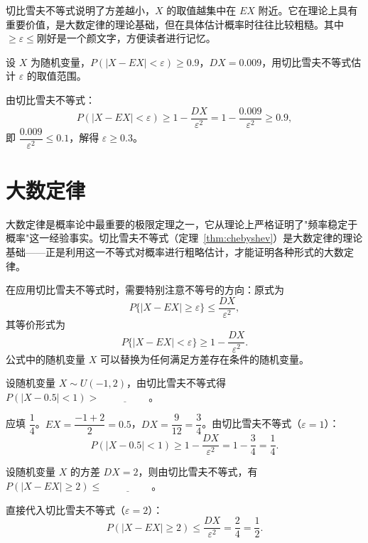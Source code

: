 \documentclass[lang=cn,11pt]{elegantbook}
\begin{document}
\begin{note}
切比雪夫不等式说明了方差越小，\(X\) 的取值越集中在 \(EX\) 附近。它在理论上具有重要价值，是大数定律的理论基础，但在具体估计概率时往往比较粗糙。其中$\geqslant \varepsilon \leqslant$刚好是一个颜文字，方便读者进行记忆。
\end{note}

\begin{exercise}\label{exer:4-s10-cheby}
设 \(X\) 为随机变量，\(P(|X - EX| < \varepsilon) \geqslant 0.9\)，\(DX = 0.009\)，用切比雪夫不等式估计 \(\varepsilon\) 的取值范围。
\end{exercise}
\begin{solution}
由切比雪夫不等式：
\[
P(|X - EX| < \varepsilon) \geqslant 1 - \frac{DX}{\varepsilon^2} = 1 - \frac{0.009}{\varepsilon^2} \geqslant 0.9,
\]
即 \(\dfrac{0.009}{\varepsilon^2} \leqslant 0.1\)，解得 \(\varepsilon \geqslant 0.3\)。
\end{solution}


\section{大数定律}

大数定律是概率论中最重要的极限定理之一，它从理论上严格证明了"频率稳定于概率"这一经验事实。切比雪夫不等式（定理~\ref{thm:chebyshev}）是大数定律的理论基础——正是利用这一不等式对概率进行粗略估计，才能证明各种形式的大数定律。

在应用切比雪夫不等式时，需要特别注意不等号的方向：原式为
\[
P\{|X - EX| \geq \varepsilon\} \leq \frac{DX}{\varepsilon^2},
\]
其等价形式为
\[
P\{|X - EX| < \varepsilon\} \geq 1 - \frac{DX}{\varepsilon^2}.
\]
公式中的随机变量 \(X\) 可以替换为任何满足方差存在条件的随机变量。

\begin{exercise}\label{exer:5-chebyshev-uniform}
设随机变量 \(X \sim U(-1,2)\)，由切比雪夫不等式得 \(P(|X - 0.5| < 1) >\,\underline{\hspace{2cm}}\)。
\end{exercise}
\begin{solution}
应填 \(\dfrac{1}{4}\)。\(EX = \dfrac{-1+2}{2} = 0.5\)，\(DX = \dfrac{9}{12} = \dfrac{3}{4}\)。由切比雪夫不等式（\(\varepsilon = 1\)）：
\[
P(|X - 0.5| < 1) \geq 1 - \frac{DX}{\varepsilon^2} = 1 - \frac{3}{4} = \frac{1}{4}.
\]
\end{solution}


\begin{exercise}\label{exer:5-chebyshev-basic}
设随机变量 \(X\) 的方差 \(DX = 2\)，则由切比雪夫不等式，有 \(P(|X - EX| \geq 2) \leq\,\underline{\hspace{2cm}}\)。
\end{exercise}
\begin{solution}
直接代入切比雪夫不等式（\(\varepsilon = 2\)）：
\[
P(|X - EX| \geq 2) \leq \frac{DX}{\varepsilon^2} = \frac{2}{4} = \frac{1}{2}.
\]
\end{solution}
\end{document}
